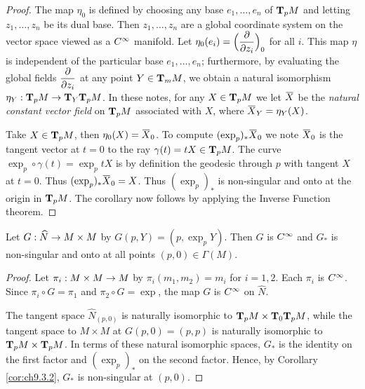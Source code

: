 \documentclass[../main]{subfiles}
\begin{document}
\begin{proof}
The map $\eta_0$ is defined by choosing any base $e_1,\dots, e_n$ of $\tangentspace{M}{p}$ and letting $z_1,\dots, z_n$ be its dual base. Then $z_1,\dots,z_n$ are a global coordinate system on the vector space viewed as a $\CInfty$ manifold. Let $\eta_0(e_i) = \Big(\pdv{}{z_i}\Big)_0$ for all $i$. This map $\eta$ is independent of the particular base $e_1,\dots,e_n$; furthermore, by evaluating the global fields $\pdv{}{z_i}$ at any point $Y \in \tangentspace{M}{m}$, we obtain a natural isomorphism $\eta_Y:\tangentspace{M}{p} \functionMaps \tangentspace{\tangentspace{M}{p}}{Y}$. In these notes, for any $X \in \tangentspace{M}{p}$ we let $\xoverline X$ be the \emph{natural constant vector field} on $\tangentspace{M}{p}$ associated with $X$, where $\xoverline X_Y = \eta_Y(X)$. 

Take $X \in \tangentspace{M}{p}$, then $\eta_0(X) = \xoverline X_0$. To compute $(\exp_p)_\ast\xoverline X_0$ we note $\xoverline X_0$ is the tangent vector at $t=0$ to the ray $\gamma(t) = tX \in \tangentspace{M}{p}$. The curve \newline $\exp_p \circ \gamma(t) = \exp_p tX$ is by definition the geodesic through $p$ with tangent $X$ at $t=0$. Thus $(\exp_p)_\ast\xoverline X_0 = X$. Thus $(\exp_p)_\ast$ is non-singular and onto at the origin in $\tangentspace{M}{p}$. The corollary now follows by applying the Inverse Function theorem.
\end{proof}



\begin{corollary} \label{cor:ch9.3.3}
Let $G: \widehat N \functionMaps M\times M$ by $G(p, Y) = (p, \exp_pY)$. Then $G$ is $\CInfty$ and $G_\ast$ is non-singular and onto at all points $(p, 0) \in \Gamma(M)$. 
\end{corollary} 

\begin{proof}
Let $\pi_i : M\times M \functionMaps M$ by $\pi_i(m_1, m_2) = m_i$ for $i=1, 2$. Each $\pi_i$ is $\CInfty$. Since $\pi_i \circ G = \pi_1$ and $\pi_2 \circ G = \exp$, the map $G$ is $\CInfty$ on $\widehat N$. 

The tangent space $\widehat N_{(p, 0)}$ is naturally isomorphic to $\tangentspace{M}{p} \times \tangentspace{\tangentspace{M}{p}}{0}$, while the tangent space to $M\times M$ at $G(p, 0) = (p, p)$ is naturally isomorphic to $\tangentspace{M}{p} \times \tangentspace{M}{p}$. In terms of these natural isomorphic spaces, $G_\ast$ is the identity on the first factor and $(\exp_p)_\ast$ on the second factor. Hence, by Corollary \ref{cor:ch9.3.2}, $G_\ast$ is non-singular at $(p,0)$.
\end{proof}
\end{document}
